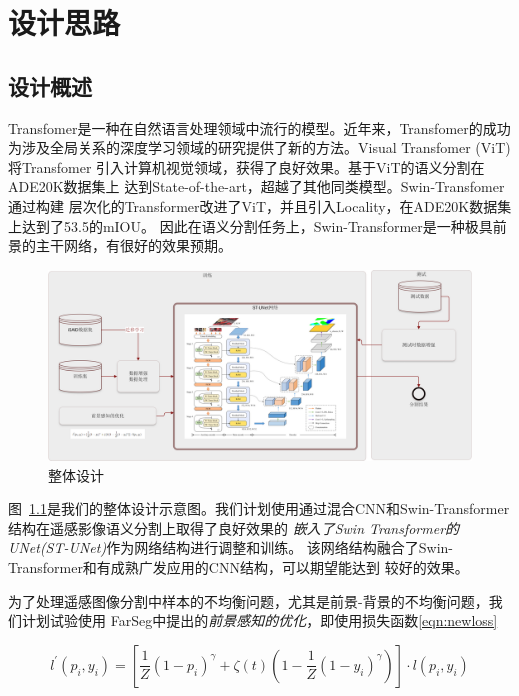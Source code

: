\documentclass[a4paper,twoside,zihao=5,UTF8]{ctexrep}
\begin{document}
\part{设计思路}

\chapter{设计概述}
Transfomer是一种在自然语言处理领域中流行的模型。近年来，Transfomer的成功
为涉及全局关系的深度学习领域的研究提供了新的方法。Visual Transfomer (ViT)\cite{vit}将Transfomer
引入计算机视觉领域，获得了良好效果。基于ViT的语义分割\cite{segmenter}在ADE20K数据集上
达到State-of-the-art，超越了其他同类模型。Swin-Transfomer\cite{swin}通过构建
层次化的Transformer改进了ViT，并且引入Locality，在ADE20K数据集上达到了53.5的mIOU。
因此在语义分割任务上，Swin-Transformer是一种极具前景的主干网络，有很好的效果预期。

\begin{figure}[htbp]
    \includegraphics[width=\textwidth]{flowchart.png}
    \centering
    \caption{整体设计}
    \label{fig:fulldesign}
\end{figure}

图~\ref{fig:fulldesign}是我们的整体设计示意图。我们计划使用通过混合CNN和Swin-Transformer结构在遥感影像语义分割上取得了良好效果的
\emph{嵌入了Swin Transformer的UNet(ST-UNet)}\cite{stunet}作为网络结构进行调整和训练。
该网络结构融合了Swin-Transformer和有成熟广发应用的CNN结构，可以期望能达到
较好的效果。

为了处理遥感图像分割中样本的不均衡问题，尤其是前景-背景的不均衡问题，我们计划试验使用
FarSeg\cite{farseg}中提出的\emph{前景感知的优化}，即使用损失函数\eqref{eqn:newloss}

\begin{equation}
    \label{eqn:newloss}
    l^{'}(p_i,y_i)=[\frac{1}{Z}(1-p_i)^\gamma+\zeta (t)(1-\frac{1}{Z}(1-y_i)^\gamma)]\cdot l(p_i,y_i)
\end{equation}
\end{document}
